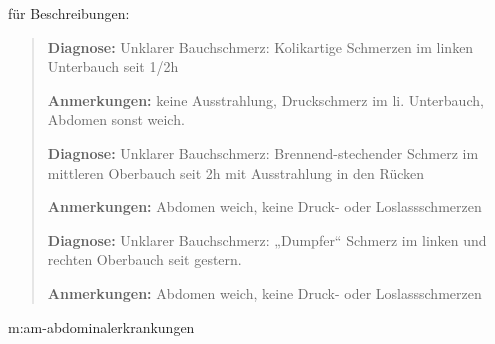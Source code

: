 {für Beschreibungen:
\begin{quote}
{\sffamily\bfseries Diagnose:} {\ttfamily Unklarer
Bauchschmerz: Kolikartige Schmerzen im linken Unterbauch seit 1/2h }

{\sffamily\bfseries Anmerkungen:} {\ttfamily keine
Ausstrahlung, Druckschmerz im li. Unter\-bauch, Abdomen sonst 
weich.}
\vspace{0.5em}

{\sffamily\bfseries Diagnose:} {\ttfamily Unklarer
Bauchschmerz: Brennend-stechender Schmerz im mittleren
Oberbauch seit 2h mit Ausstrahlung in den Rücken}

{\sffamily\bfseries Anmerkungen:} {\ttfamily Abdomen weich,
keine Druck- oder Loslassschmerzen}
\vspace{0.5em}

{\sffamily\bfseries Diagnose:} {\ttfamily Unklarer
Bauchschmerz: „Dumpfer“ Schmerz im linken und rechten
Oberbauch seit gestern. }

{\sffamily\bfseries Anmerkungen:} {\ttfamily Abdomen
weich, keine Druck- oder Loslassschmerzen}
\end{quote}
}{

}{}{}{}




{m:am-abdominalerkrankungen}
{
}{}
% 
%   
%   


